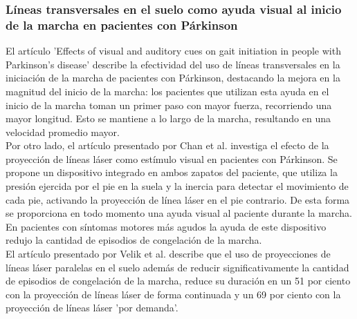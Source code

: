\subsubsection{Líneas transversales en el suelo como ayuda visual al inicio de la marcha en pacientes con Párkinson}
El artículo 'Effects of visual and auditory cues on gait initiation in people with Parkinson's disease' \cite{doi:10.1191/0269215506cr925oa} describe la efectividad del uso de líneas transversales en la iniciación de la marcha de pacientes con Párkinson, destacando la mejora en la magnitud del inicio de la marcha: los pacientes que utilizan esta ayuda en el inicio de la marcha toman un primer paso con mayor fuerza, recorriendo una mayor longitud. Esto se mantiene a lo largo de la marcha, resultando en una velocidad promedio mayor.\\

Por otro lado, el artículo presentado por Chan et al.\cite{10.3389/fbioe.2024.1334403} investiga el efecto de la proyección de líneas láser como estímulo visual en pacientes con Párkinson. Se propone un dispositivo integrado en ambos zapatos del paciente, que utiliza la presión ejercida por el pie en la suela y la inercia para detectar el movimiento de cada pie, activando la proyección de línea láser en el pie contrario. De esta forma se proporciona en todo momento una ayuda visual al paciente durante la marcha. En pacientes con síntomas motores más agudos la ayuda de este dispositivo redujo la cantidad de episodios de congelación de la marcha.\\

El artículo presentado por Velik et al. \cite{6347005} describe que el uso de proyecciones de líneas láser paralelas en el suelo además de reducir significativamente la cantidad de episodios de congelación de la marcha, reduce su duración en un 51 por ciento con la proyección de líneas láser de forma continuada y un 69 por ciento con la proyección de líneas láser 'por demanda'.

